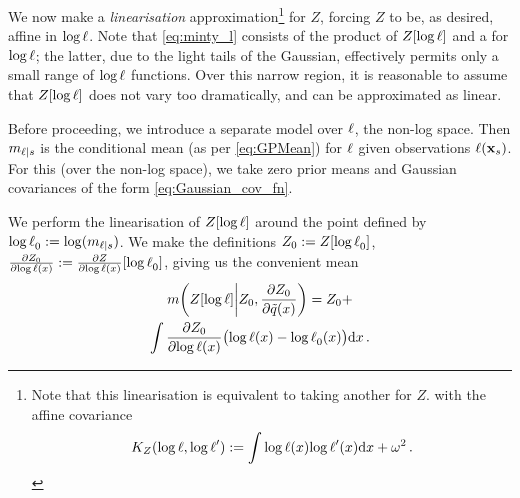 \documentclass{article}
\begin{document}
We now make a \emph{linearisation} approximation\footnote{Note that this linearisation is equivalent to taking another \gpb for $Z$. with the affine covariance
\begin{equation*}
 K_Z(\tr,\tr')
\deq
\int\tr(\lfv) \tr'(\lfv) \ud \lfv
+ \omega^2\,.
\end{equation*}
} 
for $Z$, forcing $Z$ to be, as desired, affine in $\tr$. 
Note that \eqref{eq:minty_l} consists of the product of $Z[\tr]$ and a \gpb for $\tr$; the latter, due to the light tails of the Gaussian, effectively permits only a small range of $\tr$ functions. Over this narrow region, it is reasonable to assume that $Z[\tr]$ does not vary too dramatically, and can be approximated as linear. 

Before proceeding, we introduce a separate \gpb model over $\lfn$, the non-log space.  Then $m_{\lfn|s}$ is the \gpb conditional mean (as per \eqref{eq:GPMean}) for $\lfn$ given observations $\lfn(\vlfv_s)$. For this \gpb (over the non-log space), we take zero prior means and Gaussian
covariances of the form \eqref{eq:Gaussian_cov_fn}. 

We perform the linearisation of $Z[\tr]$ around the point defined by $\tr_0 \deq \log (m_{\lfn|s})$. We make the definitions 
$Z_0 \deq Z[\tr_0]$, $\pderiv{Z_0}{\tr(\lfv)} \deq \pderiv{Z}{\tr(\lfv)}[\tr_0]$, giving us the convenient mean
\begin{multline}\label{eq:linearisation}
\novmean{Z[\tr]}{Z_0,\pderiv{Z_0}{\tq(\lfv)}} 
= Z_0+\\
\int \pderiv{Z_0}{\tr(\lfv)}\bigl(\tr(\lfv)-\tr_0(\lfv)\bigr)\ud\lfv\,.
\end{multline}
\end{document}

